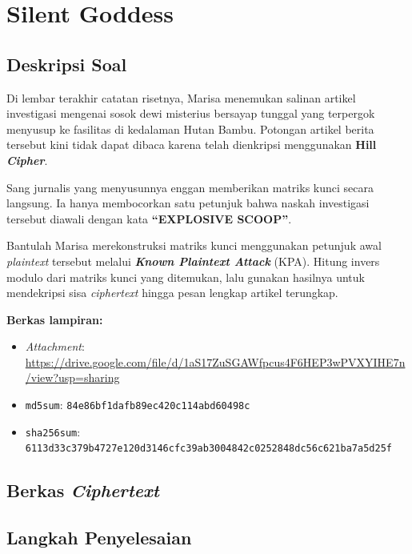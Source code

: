 \section{Silent Goddess}

\subsection*{Deskripsi Soal}

Di lembar terakhir catatan risetnya, Marisa menemukan salinan artikel
investigasi mengenai sosok dewi misterius bersayap tunggal yang terpergok
menyusup ke fasilitas di kedalaman Hutan Bambu. Potongan artikel berita
tersebut kini tidak dapat dibaca karena telah dienkripsi menggunakan
\textbf{Hill \textit{Cipher}}.

Sang jurnalis yang menyusunnya enggan memberikan matriks kunci secara langsung.
Ia hanya membocorkan satu petunjuk bahwa naskah investigasi tersebut diawali
dengan kata \textbf{``EXPLOSIVE SCOOP''}.

Bantulah Marisa merekonstruksi matriks kunci menggunakan petunjuk awal
\textit{plaintext} tersebut melalui \textbf{\textit{Known Plaintext Attack}}
(KPA). Hitung invers modulo dari matriks kunci yang ditemukan, lalu gunakan
hasilnya untuk mendekripsi sisa \textit{ciphertext} hingga pesan lengkap
artikel terungkap.

\medskip
\noindent\textbf{Berkas lampiran:}
\begin{itemize}[nosep]
  \item \textit{Attachment}: \url{https://drive.google.com/file/d/1aS17ZuSGAWfpcus4F6HEP3wPVXYIHE7n/view?usp=sharing}
  \item \texttt{md5sum}: \texttt{84e86bf1dafb89ec420c114abd60498c}
  \item \texttt{sha256sum}: \texttt{6113d33c379b4727e120d3146cfc39ab3004842c0252848dc56c621ba7a5d25f}
\end{itemize}

\subsection*{Berkas \textit{Ciphertext}}


\subsection*{Langkah Penyelesaian}

